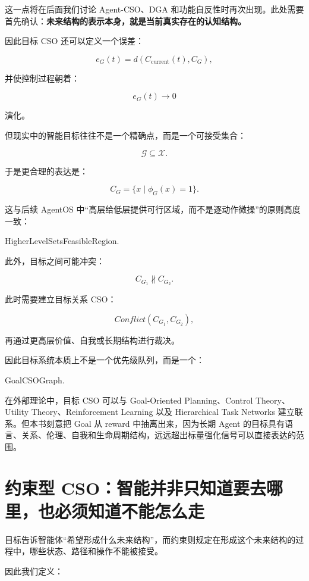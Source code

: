 这一点将在后面我们讨论 Agent-CSO、DGA 和功能自反性时再次出现。此处需要首先确认：\textbf{未来结构的表示本身，就是当前真实存在的认知结构。}

因此目标 CSO 还可以定义一个误差：

\[
e_G(t)
=
d
\left(
C_{\mathrm{current}}(t),
C_G
\right),
\]

并使控制过程朝着：

\[
e_G(t)\rightarrow 0
\]

演化。

但现实中的智能目标往往不是一个精确点，而是一个可接受集合：

\[
\mathcal G
\subseteq
\mathcal X.
\]

于是更合理的表达是：

\[
C_G
=
\{
x\mid
\phi_G(x)=1
\}.
\]

这与后续 AgentOS 中“高层给低层提供可行区域，而不是逐动作微操”的原则高度一致：

\begin{statementbox}
HigherLevelSetsFeasibleRegion.
\end{statementbox}

此外，目标之间可能冲突：

\[
C_{G_1}
\not\parallel
C_{G_2}.
\]

此时需要建立目标关系 CSO：

\[
Conflict(C_{G_1},C_{G_2}),
\]

再通过更高层价值、自我或长期结构进行裁决。

因此目标系统本质上不是一个优先级队列，而是一个：

\begin{statementbox}
GoalCSOGraph.
\end{statementbox}

在外部理论中，目标 CSO 可以与 Goal-Oriented Planning、Control Theory、Utility Theory、Reinforcement Learning 以及 Hierarchical Task Networks 建立联系。但本书刻意把 Goal 从 reward 中抽离出来，因为长期 Agent 的目标具有语言、关系、伦理、自我和生命周期结构，远远超出标量强化信号可以直接表达的范围。


\section{约束型 CSO：智能并非只知道要去哪里，也必须知道不能怎么走}

目标告诉智能体“希望形成什么未来结构”，而约束则规定在形成这个未来结构的过程中，哪些状态、路径和操作不能被接受。

因此我们定义：

